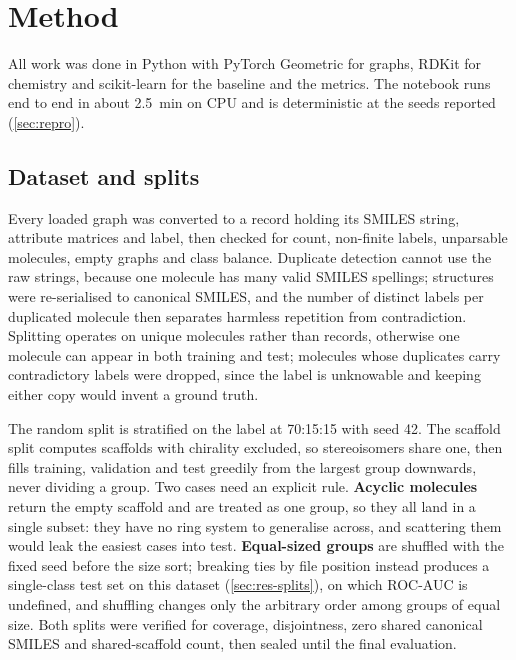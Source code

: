 \section{Method}
\label{sec:method}

All work was done in Python with PyTorch Geometric \parencite{PyG} for graphs, RDKit \parencite{RDKit} for chemistry and scikit-learn \parencite{sklearn} for the baseline and the metrics. The notebook runs end to end in about \SI{2.5}{\minute} on CPU and is deterministic at the seeds reported (\ref{sec:repro}).

\subsection{Dataset and splits}

Every loaded graph was converted to a record holding its SMILES string, attribute matrices and label, then checked for count, non-finite labels, unparsable molecules, empty graphs and class balance. Duplicate detection cannot use the raw strings, because one molecule has many valid SMILES spellings; structures were re-serialised to canonical SMILES, and the number of distinct labels per duplicated molecule then separates harmless repetition from contradiction. Splitting operates on unique molecules rather than records, otherwise one molecule can appear in both training and test; molecules whose duplicates carry contradictory labels were dropped, since the label is unknowable and keeping either copy would invent a ground truth.

The random split is stratified on the label at 70:15:15 with seed 42. The scaffold split computes scaffolds with chirality excluded, so stereoisomers share one, then fills training, validation and test greedily from the largest group downwards, never dividing a group. Two cases need an explicit rule. \textbf{Acyclic molecules} return the empty scaffold and are treated as one group, so they all land in a single subset: they have no ring system to generalise across, and scattering them would leak the easiest cases into test. \textbf{Equal-sized groups} are shuffled with the fixed seed before the size sort; breaking ties by file position instead produces a single-class test set on this dataset (\cref{sec:res-splits}), on which ROC-AUC is undefined, and shuffling changes only the arbitrary order among groups of equal size. Both splits were verified for coverage, disjointness, zero shared canonical SMILES and shared-scaffold count, then sealed until the final evaluation.

